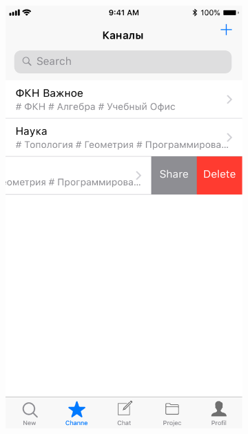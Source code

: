 \documentclass[a4paper,12pt,reqno]{article}
\begin{document}
\begin{figure}[h!]
\begin{subfigure}[b]{0.3\linewidth}
			\includegraphics[width=\linewidth]{../includes/prototype/4.pdf}
		\end{subfigure}
		\begin{subfigure}[b]{0.3\linewidth}

\end{subfigure}
\end{figure}
\end{document}
